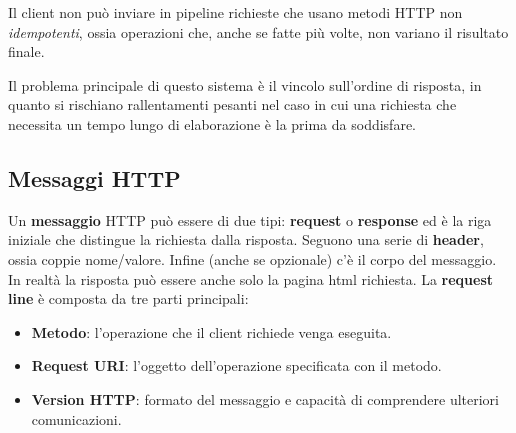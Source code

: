 Il client non può inviare in pipeline richieste che usano metodi HTTP non \emph{idempotenti}, ossia
operazioni che, anche se fatte più volte, non variano il risultato finale.

Il problema principale di questo sistema è il vincolo sull'ordine di risposta, in quanto si
rischiano rallentamenti pesanti nel caso in cui una richiesta che necessita un tempo lungo di 
elaborazione è la prima da soddisfare.

\subsection{Messaggi HTTP}
Un \textbf{messaggio} HTTP può essere di due tipi: \textbf{request} o \textbf{response} ed è la
riga iniziale che distingue la richiesta dalla risposta. Seguono una serie di \textbf{header},
ossia coppie nome/valore. Infine (anche se opzionale) c'è il corpo del messaggio. In realtà
la risposta può essere anche solo la pagina html richiesta. La \textbf{request line} è composta da
tre parti principali:
\begin{itemize}
	\item \textbf{Metodo}: l'operazione che il client richiede venga eseguita.
	\item \textbf{Request URI}: l'oggetto dell'operazione specificata con il metodo.
	\item \textbf{Version HTTP}: formato del messaggio e capacità di comprendere ulteriori
		comunicazioni.
\end{itemize}


